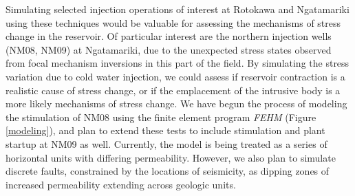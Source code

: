 Simulating selected injection operations of interest at Rotokawa and Ngatamariki using these techniques would be valuable for assessing the mechanisms of stress change in the reservoir. Of particular interest are the northern injection wells (NM08, NM09) at Ngatamariki, due to the unexpected stress states observed from focal mechanism inversions in this part of the field. By simulating the stress variation due to cold water injection, we could assess if reservoir contraction is a realistic cause of stress change, or if the emplacement of the intrusive body is a more likely mechanisms of stress change. We have begun the process of modeling the \gls{stimulation} of NM08 using the finite element program \textit{FEHM} \citep{zyvoloski2007fehm}(Figure \ref{modeling}), and plan to extend these tests to include \gls{stimulation} and plant startup at NM09 as well. Currently, the model is being treated as a series of horizontal units with differing \gls{permeability}. However, we also plan to simulate discrete faults, constrained by the locations of seismicity, as dipping zones of increased \gls{permeability} extending across geologic units.

